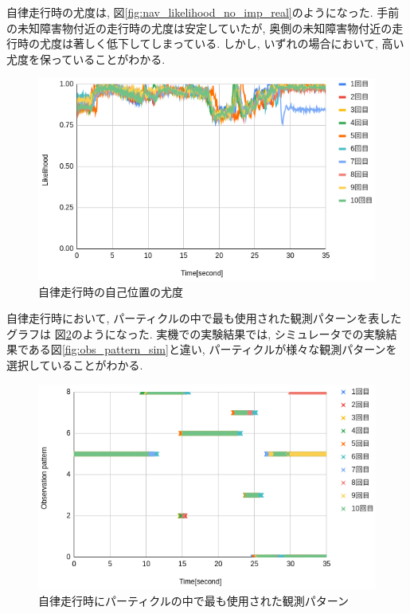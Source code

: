 自律走行時の尤度は, 図\ref{fig:nav_likelihood_no_imp_real}のようになった. 
手前の未知障害物付近の走行時の尤度は安定していたが, 
奥側の未知障害物付近の走行時の尤度は著しく低下してしまっている. 
しかし, いずれの場合において, 高い尤度を保っていることがわかる. 

\begin{figure}[H]
  \begin{center}
    \includegraphics[width=0.98\linewidth]{figs/real_likelihood_after.png}
    \caption{自律走行時の自己位置の尤度}
    \label{fig:sim_world}
  \end{center}
\end{figure}

自律走行時において, パーティクルの中で最も使用された観測パターンを表したグラフは
図\ref{fig:obs_pattern_sim_real}のようになった. 
実機での実験結果では, シミュレータでの実験結果である図\ref{fig:obs_pattern_sim}と違い, 
パーティクルが様々な観測パターンを選択していることがわかる. 

\begin{figure}[H]
  \begin{center}
    \includegraphics[width=0.98\linewidth]{figs/real_imp_ob_pattern.png}
    \caption{自律走行時にパーティクルの中で最も使用された観測パターン}
    \label{fig:obs_pattern_sim_real}
  \end{center}
\end{figure}
